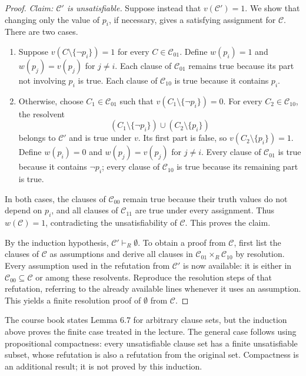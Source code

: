 \documentclass[11pt,a4paper]{amsart}
\begin{document}
\begin{proof}
  \emph{Claim: \(\mathcal C'\) is unsatisfiable.}
  Suppose instead that \(v(\mathcal C')=1\). We show that changing only
  the value of \(p_i\), if necessary, gives a satisfying assignment for
  \(\mathcal C\). There are two cases.
  \begin{enumerate}
    \item Suppose \(v(C\setminus\{\neg p_i\})=1\) for every
      \(C\in\mathcal C_{01}\). Define \(w(p_i)=1\) and
      \(w(p_j)=v(p_j)\) for \(j\ne i\). Each clause of
      \(\mathcal C_{01}\) remains true because its part not involving
      \(p_i\) is true. Each clause of \(\mathcal C_{10}\) is true because
      it contains \(p_i\).
    \item Otherwise, choose \(C_1\in\mathcal C_{01}\) such that
      \(v(C_1\setminus\{\neg p_i\})=0\). For every
      \(C_2\in\mathcal C_{10}\), the resolvent
      \[
        (C_1\setminus\{\neg p_i\})\cup(C_2\setminus\{p_i\})
      \]
      belongs to \(\mathcal C'\) and is true under \(v\). Its first part
      is false, so \(v(C_2\setminus\{p_i\})=1\).
      Define \(w(p_i)=0\) and \(w(p_j)=v(p_j)\) for \(j\ne i\).
      Every clause of \(\mathcal C_{01}\) is true because it contains
      \(\neg p_i\); every clause of \(\mathcal C_{10}\) is true because
      its remaining part is true.
  \end{enumerate}
  In both cases, the clauses of \(\mathcal C_{00}\) remain true because
  their truth values do not depend on \(p_i\), and all clauses of
  \(\mathcal C_{11}\) are true under every assignment. Thus
  \(w(\mathcal C)=1\), contradicting the unsatisfiability of \(\mathcal C\).
  This proves the claim.

  By the induction hypothesis, \(\mathcal C'\vdash_R\emptyset\).
  To obtain a proof from \(\mathcal C\), first list the clauses of
  \(\mathcal C\) as assumptions and derive all clauses in
  \(\mathcal C_{01}\times_R\mathcal C_{10}\) by resolution. Every assumption
  used in the refutation from \(\mathcal C'\) is now available: it is either
  in \(\mathcal C_{00}\subseteq\mathcal C\) or among these resolvents.
  Reproduce the resolution steps of that refutation, referring to the
  already available lines whenever it uses an assumption. This yields a
  finite resolution proof of \(\emptyset\) from \(\mathcal C\).
\end{proof}

\begin{remark}
  The course book states Lemma 6.7 for arbitrary clause sets, but the
  induction above proves the finite case treated in the lecture. The
  general case follows using propositional compactness: every unsatisfiable
  clause set has a finite unsatisfiable subset, whose refutation is also a
  refutation from the original set. Compactness is an additional result;
  it is not proved by this induction.
\end{remark}
\end{document}
